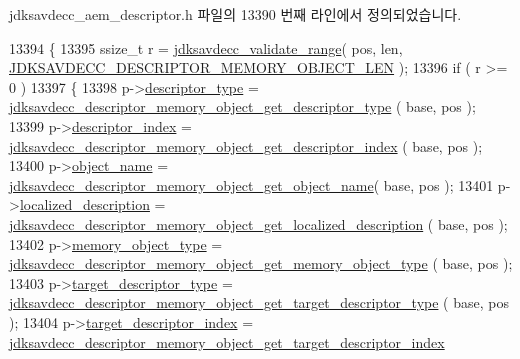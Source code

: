 jdksavdecc\+\_\+aem\+\_\+descriptor.\+h 파일의 13390 번째 라인에서 정의되었습니다.


\begin{DoxyCode}
13394 \{
13395     ssize\_t r = \hyperlink{group__util_ga9c02bdfe76c69163647c3196db7a73a1}{jdksavdecc\_validate\_range}( pos, len, 
      \hyperlink{group__descriptor__memory__object_gad4027419245acec5ed6ac76adda4d015}{JDKSAVDECC\_DESCRIPTOR\_MEMORY\_OBJECT\_LEN} );
13396     \textcolor{keywordflow}{if} ( r >= 0 )
13397     \{
13398         p->\hyperlink{structjdksavdecc__descriptor__memory__object_ab7c32b6c7131c13d4ea3b7ee2f09b78d}{descriptor\_type} = 
      \hyperlink{group__descriptor__memory__object_ga4ba681d68c1e610b31721bb134a863e2}{jdksavdecc\_descriptor\_memory\_object\_get\_descriptor\_type}
      ( base, pos );
13399         p->\hyperlink{structjdksavdecc__descriptor__memory__object_a042bbc76d835b82d27c1932431ee38d4}{descriptor\_index} = 
      \hyperlink{group__descriptor__memory__object_ga1a5e3258584bf1095c4c5a59cb7f9da0}{jdksavdecc\_descriptor\_memory\_object\_get\_descriptor\_index}
      ( base, pos );
13400         p->\hyperlink{structjdksavdecc__descriptor__memory__object_a7d1f5945a13863b1762fc6db74fa8f80}{object\_name} = 
      \hyperlink{group__descriptor__memory__object_gae66213e78842bf5215167cf71ae948a3}{jdksavdecc\_descriptor\_memory\_object\_get\_object\_name}( 
      base, pos );
13401         p->\hyperlink{structjdksavdecc__descriptor__memory__object_a0926f846ca65a83ad5bb06b4aff8f408}{localized\_description} = 
      \hyperlink{group__descriptor__memory__object_gabdaad53ba24e023cc7f1cfa9d26d4426}{jdksavdecc\_descriptor\_memory\_object\_get\_localized\_description}
      ( base, pos );
13402         p->\hyperlink{structjdksavdecc__descriptor__memory__object_a836ed1042ae19b71bdb4c8d8822c39e8}{memory\_object\_type} = 
      \hyperlink{group__descriptor__memory__object_ga55cc834cf0e4b3835344973adadbd668}{jdksavdecc\_descriptor\_memory\_object\_get\_memory\_object\_type}
      ( base, pos );
13403         p->\hyperlink{structjdksavdecc__descriptor__memory__object_a37cbc6edcac0d8d8c2006c0d6f3c00af}{target\_descriptor\_type} = 
      \hyperlink{group__descriptor__memory__object_gadbecbf3e61d3e7b8c8380c93ac5d5bc9}{jdksavdecc\_descriptor\_memory\_object\_get\_target\_descriptor\_type}
      ( base, pos );
13404         p->\hyperlink{structjdksavdecc__descriptor__memory__object_a25114746ea494f3fcb88975177992d78}{target\_descriptor\_index} = 
      \hyperlink{group__descriptor__memory__object_ga5e6b54bc54bcb9710c1b6207859f32cc}{jdksavdecc\_descriptor\_memory\_object\_get\_target\_descriptor\_index}

\end{DoxyCode}
